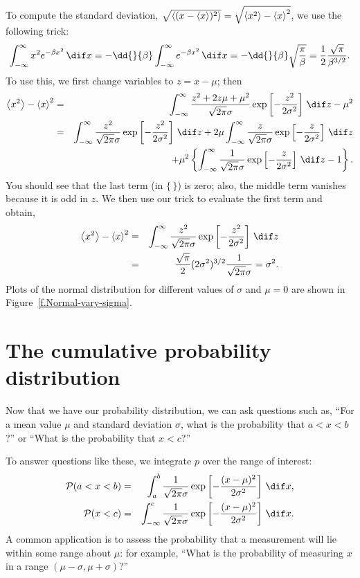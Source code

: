 To compute the standard deviation, $\sqrt{\left\langle(x-\left\langle x\right\rangle)^{2}\right\rangle} = \sqrt{\left\langle x^{2}\right\rangle-\left\langle x\right\rangle^{2}}$, 
we use the following trick:
\[
	\int_{-\infty}^{\infty}x^{2}e^{-\beta x^{2}}\,\dif x 
		= -\dd{}{\beta}\int_{-\infty}^{\infty}e^{-\beta x^{2}}\,\dif x = -\dd{}{\beta}\sqrt{\frac{\pi}{\beta}} = \frac{1}{2}\frac{\sqrt{\pi}}{\beta^{3/2}}.
\]
To use this, we first change variables to $z = x-\mu$; then
\begin{eqnarray*}
	\mean{x^{2}} - \mean{x}^{2} &=& \int_{-\infty}^{\infty}\frac{z^{2}+2z\mu+\mu^{2}}{\sqrt{2\pi}\sigma} \exp\left[-\frac{z^{2}}{2\sigma^{2}}\right]\,\dif z - \mu^{2}\\
		&=& \int_{-\infty}^{\infty}\frac{z^{2}}{\sqrt{2\pi}\sigma} \exp\left[-\frac{z^{2}}{2\sigma^{2}}\right]\,\dif z + 2\mu \int_{-\infty}^{\infty}\frac{z}{\sqrt{2\pi}\sigma} \exp\left[-\frac{z}{2\sigma^{2}}\right]\,\dif z \\
		&& + \mu^{2}\left\{ \int_{-\infty}^{\infty} \frac{1}{\sqrt{2\pi}\sigma} \exp\left[-\frac{z}{2\sigma^{2}}\right]\,\dif z - 1\right\}.
\end{eqnarray*}
You should see that the last term (in $\{\,\}$) is zero; also, the middle term vanishes because it is odd in $z$.  We then use our trick to evaluate the first term and obtain,
\begin{eqnarray*}
	\mean{x^{2}} - \mean{x}^{2} &=& \int_{-\infty}^{\infty}\frac{z^{2}}{\sqrt{2\pi}\sigma} \exp\left[-\frac{z^{2}}{2\sigma^{2}}\right]\,\dif z \\
	&=& \frac{\sqrt{\pi}}{2}(2\sigma^{2})^{3/2}\frac{1}{\sqrt{2\pi}\sigma} = \sigma^{2}.
\end{eqnarray*}
Plots of the normal distribution for different values of $\sigma$ and $\mu=0$ are shown in Figure~\ref{f.Normal-vary-sigma}.

\section{The cumulative probability distribution}

Now that we have our probability distribution, we can ask questions such as, ``For a mean value $\mu$ and standard deviation $\sigma$, what is the probability that $a < x < b$?'' or ``What is the probability that $x < c$?''

To answer questions like these, we integrate $p$ over the range of interest:
\begin{eqnarray*}
	\prob(a< x < b) &=& \int_{a}^{b} \frac{1}{\sqrt{2\pi}\sigma}\exp\left[-\frac{(x-\mu)^{2}}{2\sigma^{2}}\right]\,\dif x,\\
	\prob(x < c) &=& \int_{-\infty}^{c} \frac{1}{\sqrt{2\pi}\sigma}\exp\left[-\frac{(x-\mu)^{2}}{2\sigma^{2}}\right]\,\dif x.
\end{eqnarray*}
A common application is to assess the probability that a measurement will lie within some range about $\mu$: for example, ``What is the probability of measuring $x$ in a range $(\mu-\sigma,\mu+\sigma)$?'' 

